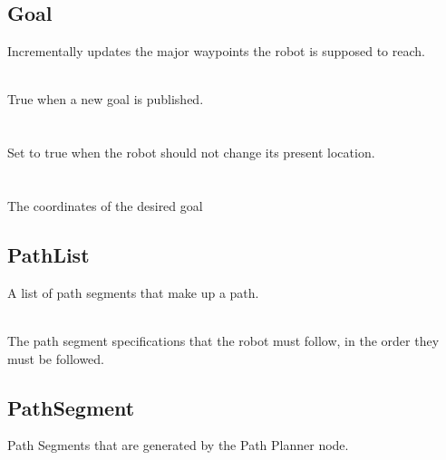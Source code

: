 \subsection{Goal}
Incrementally updates the major waypoints the robot is supposed to reach.

\\
\indent True when a new goal is published.\\
\\
\\
\indent Set to true when the robot should not change its present location.\\
\\
\\
\indent The coordinates of the desired goal\\

\subsection{PathList}
A list of path segments that make up a path.

\\
\indent The path segment specifications that the robot must follow, in the order they must be followed.\\

\subsection{PathSegment}
Path Segments that are generated by the Path Planner node.

